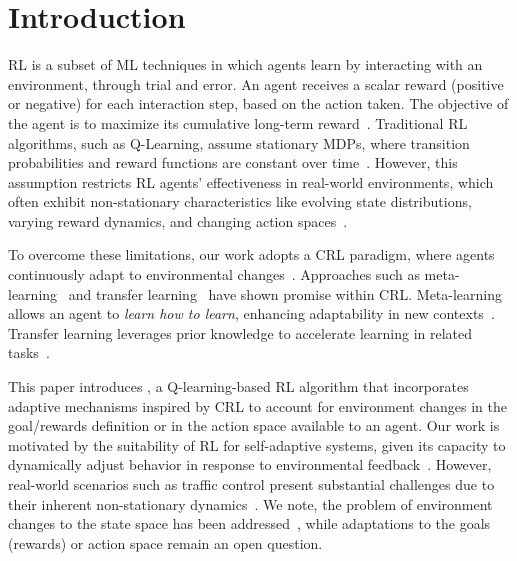 
\section{Introduction}
\label{sec:introduction}

\acf{RL} is a subset of \ac{ML} techniques in which agents learn by interacting with an environment, 
through trial and error. An agent receives a scalar reward (positive or negative) for each interaction 
step, based on the action taken. The objective of the agent is to maximize its cumulative long-term 
reward~\cite{sutton18}. Traditional \ac{RL} algorithms, such as Q-Learning, assume stationary 
\acp{MDP}, where transition probabilities and reward functions are constant over 
time~\cite{meta-rl-traffic}. However, this assumption restricts \ac{RL} agents' effectiveness in 
real-world environments, which often exhibit non-stationary characteristics like evolving state 
distributions, varying reward dynamics, and changing action 
spaces~\cite{khetarpal2022continualreinforcementlearningreview}.

To overcome these limitations, our work adopts a \acf{CRL} paradigm, where agents continuously 
adapt to environmental changes~\cite{abel2023definitioncontinualreinforcementlearning}. Approaches 
such as meta-learning~\cite{zintgraf21} and transfer learning~\cite{zhuang20} have shown promise 
within \ac{CRL}. Meta-learning allows an agent to \emph{learn how to learn}, enhancing adaptability in 
new contexts~\cite{beck2024surveymetareinforcementlearning}. Transfer learning leverages prior 
knowledge to accelerate learning in related tasks~\cite{chen2022transferredqlearning}.

This paper introduces \adaptiverl, a Q-learning-based \ac{RL} algorithm that incorporates adaptive 
mechanisms inspired by \ac{CRL} to account for environment changes in the goal/rewards definition 
or in the action space available to an agent. Our work is motivated by the suitability of \ac{RL} for 
self-adaptive systems, given its capacity to dynamically adjust behavior in response to environmental 
feedback~\cite{HENRICHS2022106940}. However, real-world scenarios such as traffic control 
present substantial challenges due to their inherent non-stationary dynamics~\cite{meta-rl-traffic}. 
We note, the problem of environment changes to the state space has been addressed~\cite{gueriau19}, 
while adaptations to the goals (\ie rewards) or action space remain an open question.

